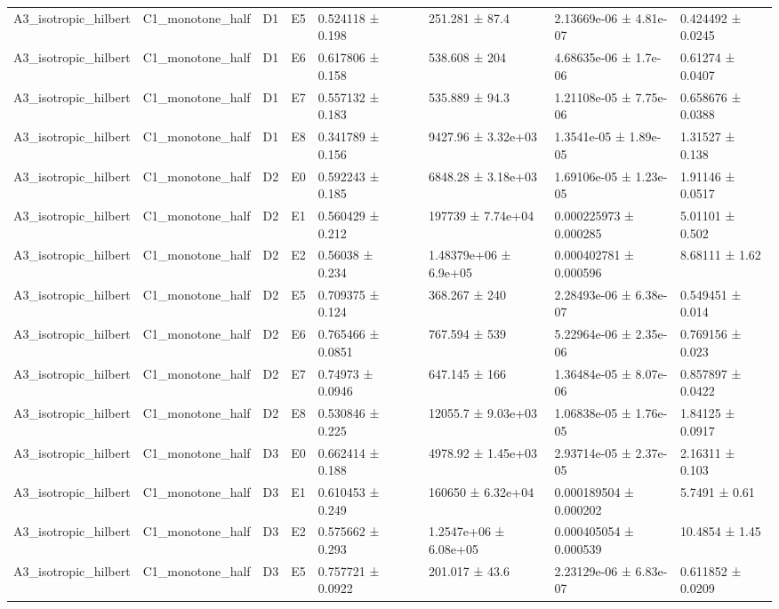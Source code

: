 \begin{table}
\begin{tabular}{lllllllll}
A3\_isotropic\_hilbert & C1\_monotone\_half & D1 & E5 & 0.524118 ± 0.198 &  & 251.281 ± 87.4 & 2.13669e-06 ± 4.81e-07 & 0.424492 ± 0.0245 \\
A3\_isotropic\_hilbert & C1\_monotone\_half & D1 & E6 & 0.617806 ± 0.158 &  & 538.608 ± 204 & 4.68635e-06 ± 1.7e-06 & 0.61274 ± 0.0407 \\
A3\_isotropic\_hilbert & C1\_monotone\_half & D1 & E7 & 0.557132 ± 0.183 &  & 535.889 ± 94.3 & 1.21108e-05 ± 7.75e-06 & 0.658676 ± 0.0388 \\
A3\_isotropic\_hilbert & C1\_monotone\_half & D1 & E8 & 0.341789 ± 0.156 &  & 9427.96 ± 3.32e+03 & 1.3541e-05 ± 1.89e-05 & 1.31527 ± 0.138 \\
A3\_isotropic\_hilbert & C1\_monotone\_half & D2 & E0 & 0.592243 ± 0.185 &  & 6848.28 ± 3.18e+03 & 1.69106e-05 ± 1.23e-05 & 1.91146 ± 0.0517 \\
A3\_isotropic\_hilbert & C1\_monotone\_half & D2 & E1 & 0.560429 ± 0.212 &  & 197739 ± 7.74e+04 & 0.000225973 ± 0.000285 & 5.01101 ± 0.502 \\
A3\_isotropic\_hilbert & C1\_monotone\_half & D2 & E2 & 0.56038 ± 0.234 &  & 1.48379e+06 ± 6.9e+05 & 0.000402781 ± 0.000596 & 8.68111 ± 1.62 \\
A3\_isotropic\_hilbert & C1\_monotone\_half & D2 & E5 & 0.709375 ± 0.124 &  & 368.267 ± 240 & 2.28493e-06 ± 6.38e-07 & 0.549451 ± 0.014 \\
A3\_isotropic\_hilbert & C1\_monotone\_half & D2 & E6 & 0.765466 ± 0.0851 &  & 767.594 ± 539 & 5.22964e-06 ± 2.35e-06 & 0.769156 ± 0.023 \\
A3\_isotropic\_hilbert & C1\_monotone\_half & D2 & E7 & 0.74973 ± 0.0946 &  & 647.145 ± 166 & 1.36484e-05 ± 8.07e-06 & 0.857897 ± 0.0422 \\
A3\_isotropic\_hilbert & C1\_monotone\_half & D2 & E8 & 0.530846 ± 0.225 &  & 12055.7 ± 9.03e+03 & 1.06838e-05 ± 1.76e-05 & 1.84125 ± 0.0917 \\
A3\_isotropic\_hilbert & C1\_monotone\_half & D3 & E0 & 0.662414 ± 0.188 &  & 4978.92 ± 1.45e+03 & 2.93714e-05 ± 2.37e-05 & 2.16311 ± 0.103 \\
A3\_isotropic\_hilbert & C1\_monotone\_half & D3 & E1 & 0.610453 ± 0.249 &  & 160650 ± 6.32e+04 & 0.000189504 ± 0.000202 & 5.7491 ± 0.61 \\
A3\_isotropic\_hilbert & C1\_monotone\_half & D3 & E2 & 0.575662 ± 0.293 &  & 1.2547e+06 ± 6.08e+05 & 0.000405054 ± 0.000539 & 10.4854 ± 1.45 \\
A3\_isotropic\_hilbert & C1\_monotone\_half & D3 & E5 & 0.757721 ± 0.0922 &  & 201.017 ± 43.6 & 2.23129e-06 ± 6.83e-07 & 0.611852 ± 0.0209 \\

\end{tabular}
\end{table}
